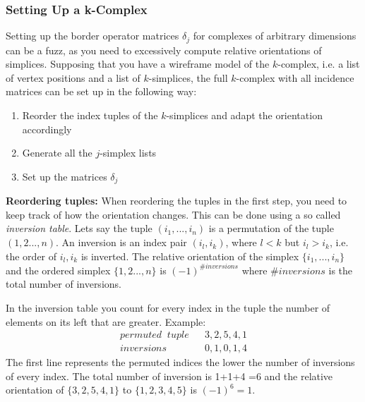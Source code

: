 \subsubsection{Setting Up a k-Complex}
Setting up the border operator matrices $\delta_j$ for complexes of arbitrary dimensions can be a fuzz, as you need to excessively compute relative orientations of simplices. Supposing that you have a wireframe model of the $k$-complex, i.e. a list of vertex positions and a list of $k$-simplices, the full $k$-complex  with all incidence matrices can be set up in the following way:
\begin{enumerate}
	\item Reorder the index tuples of the $k$-simplices and adapt the orientation accordingly
	\item Generate all the $j$-simplex lists
	\item Set up the matrices $\delta_j$
\end{enumerate}



\textbf{Reordering tuples: } When reordering the tuples in the first step, you need to keep track of how the orientation changes. This can be done using a so called \emph{inversion table}. Lets say the tuple $(i_1,...,i_n)$ is a permutation of the tuple $(1,2...,n)$. An inversion is an index pair $(i_l,i_k)$, where $l<k$ but $i_l >i_k$, i.e. the order of $i_l,i_k$ is inverted. The relative orientation of the simplex $\{i_1,...,i_n\}$ and the ordered simplex $\{1,2...,n\}$ is $(-1)^{\#inversions}$ where $\#inversions$ is the total number of inversions.

In the inversion table you count for every index in the tuple the number of elements on its left that are greater. Example: 
\begin{align*}
permuted \;\; tuple & &3,2,5,4,1 \\
inversions & & 0,1,0,1,4
\end{align*}
The first line represents the permuted indices the lower the number of inversions of every index. The total number of inversion is  1+1+4 =6 and the relative orientation of
$\{3,2,5,4,1\}$ to $\{1,2,3,4,5\}$ is $(-1)^6 = 1$.

